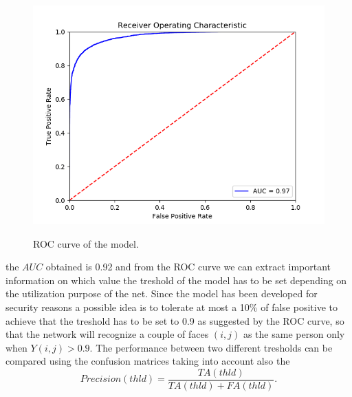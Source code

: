 \begin{figure}[t]
\begin{center}
\includegraphics[width=0.8\linewidth]{images/FINAL ROC.png}
   \caption{ROC curve of the model.}
\label{fig:long}
\label{fig:onecol}
\end{center}
\end{figure}

the $AUC$ obtained is 0.92 and from the ROC curve we can extract important information on which value the treshold of the model has to be set depending on the utilization purpose of the net.
Since the model has been developed for security reasons a possible idea is to tolerate at most a 10\% of false positive to achieve that the treshold has to be set to 0.9 as suggested by the ROC curve, so that the network will recognize a couple of faces $(i,j)$ as the same person only when $Y(i,j)>0.9$. The performance between two different tresholds can be compared using the confusion matrices taking into account also the
\begin{equation}
Precision(thld) = \frac{TA(thld)}{TA(thld)+FA(thld)}. 
\end{equation}
 
 


